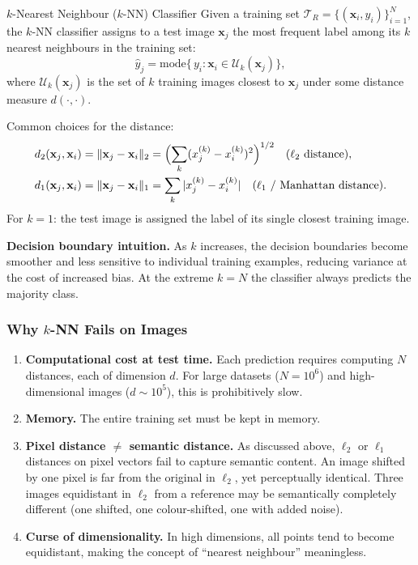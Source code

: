 \documentclass[11pt,a4paper]{article}
\begin{document}
\begin{defbox}{$k$-Nearest Neighbour ($k$-NN) Classifier}
Given a training set $\mathcal{T}_R = \{(\mathbf{x}_i, y_i)\}_{i=1}^N$, the $k$-NN classifier
assigns to a test image $\mathbf{x}_j$ the most frequent label among its $k$ nearest neighbours
in the training set:
\[
  \hat{y}_j = \mathrm{mode}\bigl\{\, y_i : \mathbf{x}_i \in \mathcal{U}_k(\mathbf{x}_j) \bigr\},
\]
where $\mathcal{U}_k(\mathbf{x}_j)$ is the set of $k$ training images closest to $\mathbf{x}_j$
under some distance measure $d(\cdot, \cdot)$.

Common choices for the distance:
\begin{align*}
  d_2(\mathbf{x}_j, \mathbf{x}_i) &= \|\mathbf{x}_j - \mathbf{x}_i\|_2
    = \Bigl(\sum_k (x_j^{(k)} - x_i^{(k)})^2\Bigr)^{1/2} \quad (\ell_2\ \text{distance}),\\
  d_1(\mathbf{x}_j, \mathbf{x}_i) &= \|\mathbf{x}_j - \mathbf{x}_i\|_1
    = \sum_k |x_j^{(k)} - x_i^{(k)}| \quad (\ell_1\ \text{/ Manhattan distance}).
\end{align*}
For $k = 1$: the test image is assigned the label of its single closest training image.
\end{defbox}

\textbf{Decision boundary intuition.}  As $k$ increases, the decision boundaries become smoother
and less sensitive to individual training examples, reducing variance at the cost of increased bias.
At the extreme $k = N$ the classifier always predicts the majority class.

\subsubsection{Why $k$-NN Fails on Images}

\begin{enumerate}
  \item \textbf{Computational cost at test time.}  Each prediction requires computing $N$ distances,
    each of dimension $d$.  For large datasets ($N = 10^6$) and high-dimensional images ($d \sim 10^5$),
    this is prohibitively slow.
  \item \textbf{Memory.}  The entire training set must be kept in memory.
  \item \textbf{Pixel distance $\neq$ semantic distance.}  As discussed above, $\ell_2$ or $\ell_1$
    distances on pixel vectors fail to capture semantic content.  An image shifted by one pixel is
    far from the original in $\ell_2$, yet perceptually identical.  Three images equidistant in $\ell_2$
    from a reference may be semantically completely different (one shifted, one colour-shifted, one with
    added noise).
  \item \textbf{Curse of dimensionality.}  In high dimensions, all points tend to become equidistant,
    making the concept of ``nearest neighbour'' meaningless.
\end{enumerate}
\end{document}
